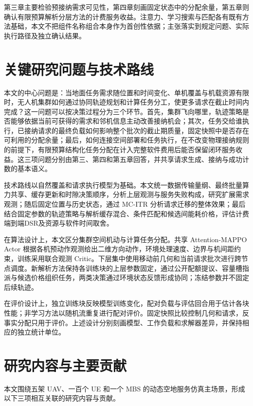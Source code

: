 第三章主要检验预接纳需求可见性，第四章刻画固定状态中的分配余量，第五章则确认有限预算解析分层方法的计费服务收益。注意力、学习搜索与匹配各有既有方法基础，本文不把组件名称组合本身作为首创性依据；主张落实到规定问题、实际执行路径及独立确认结果。

\section{关键研究问题与技术路线}
\label{sec:ch1-questions}

本文的中心问题是：当地面任务需求随位置和时间变化、单机覆盖与机载资源有限时，无人机集群如何通过协同轨迹规划和计算任务分工，使更多请求在截止时间内完成？这一问题可以按决策过程分为三个环节。首先，集群飞向哪里，轨迹策略是否能够依据当前可获得的需求和邻机信息主动改善接纳机会；其次，任务交给谁执行，已接纳请求的最终负载如何影响整个批次的截止期质量，固定快照中是否存在可利用的分配余量；最后，如何连接空间部署和任务执行，在不改变物理接纳规则的前提下，有限预算结构化任务分配在计入完整软件费用后能否保留闭环服务收益。这三项问题分别由第三、第四和第五章回答，并共享请求生成、接纳与成功计数的基本语义。

技术路线以自然覆盖和请求执行模型为基础。本文统一数据传输量纲、最终批量算力共享、缓存更新和时隙决策顺序，分析上层观测与服务失败构成，研究扩展需求观测；随后固定位置与历史状态，通过 MC-ITR 分析请求迁移的整体效果；最后结合固定参数的轨迹策略与解析缓存混合、条件匹配和候选间能耗价格，评估计费端到端DSR及资源与软件时间取舍。

在算法设计上，本文区分集群空间机动与计算任务分配。共享 Attention-MAPPO Actor 根据各机预动作观测给出二维方向动作，环境处理速度、边界与机间距约束，训练采用联合观测 Critic。下层集中使用移动前几何和当前请求批次进行跨节点调度。新解析方法保持各训练块的上层参数固定，通过公开配额提议、容量槽指派与候选价格组织任务，两类决策通过环境状态反馈形成协同；冻结参数并不固定后续轨迹。

在评价设计上，独立训练块反映模型训练变化，配对负载与评估回合用于估计各块性能；非学习方法以随机流重复进行配对评价。固定快照比较控制几何和请求，反事实分配只用于评价。上述设计分别刻画模型、工作负载和求解器差异，并保持相应的独立统计单位。

\section{研究内容与主要贡献}
\label{sec:contributions}

本文围绕五架 UAV、一百个 UE 和一个 MBS 的动态空地服务仿真主场景，形成以下三项相互关联的研究内容与贡献。

